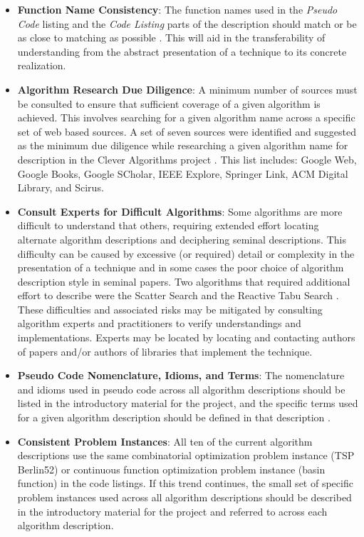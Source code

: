 \documentclass[a4paper, 11pt]{article}
\begin{document}
\begin{itemize}
	\item \textbf{Function Name Consistency}: The function names used in the \emph{Pseudo Code} listing and the \emph{Code Listing} parts of the description should match or be as close to matching as possible \cite{Brownlee2010g}. This will aid in the transferability of understanding from the abstract presentation of a technique to its concrete realization.
	\item \textbf{Algorithm Research Due Diligence}: A minimum number of sources must be consulted to ensure that sufficient coverage of a given algorithm is achieved. This involves searching for a given algorithm name across a specific set of web based sources. A set of seven sources were identified and suggested as the minimum due diligence while researching a given algorithm name for description in the Clever Algorithms project \cite{Brownlee2010h}. This list includes: Google Web, Google Books, Google SCholar, IEEE Explore, Springer Link, ACM Digital Library, and Scirus.
	\item \textbf{Consult Experts for Difficult Algorithms}: Some algorithms are more difficult to understand that others, requiring extended effort locating alternate algorithm descriptions and deciphering seminal descriptions. This difficulty can be caused by excessive (or required) detail or complexity in the presentation of a technique and in some cases the poor choice of algorithm description style in seminal papers. Two algorithms that required additional effort to describe were the Scatter Search \cite{Brownlee2010l} and the Reactive Tabu Search \cite{Brownlee2010m}. These difficulties and associated risks may be mitigated by consulting algorithm experts and practitioners to verify understandings and implementations. Experts may be located by locating and contacting authors of papers and/or authors of libraries that implement the technique. 
	\item \textbf{Pseudo Code Nomenclature, Idioms, and Terms}: The nomenclature and idioms used in pseudo code across all algorithm descriptions should be listed in the introductory material for the project, and the specific terms used for a given algorithm description should be defined in that description \cite{Brownlee2010m}.		
	\item \textbf{Consistent Problem Instances}: All ten of the current algorithm descriptions use the same combinatorial optimization problem instance (TSP Berlin52) or continuous function optimization problem instance (basin function) in the code listings. If this trend continues, the small set of specific problem instances used across all algorithm descriptions should be described in the introductory material for the project and referred to across each algorithm description.

\end{itemize}
\end{document}
